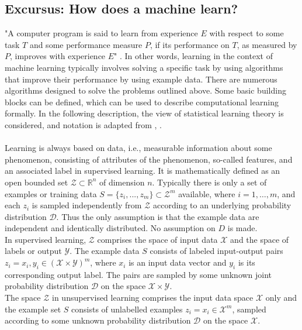 \begin{tcolorbox}
    \subsection*{Excursus: How does a machine learn?}
    "A computer program is said to learn from experience $E$ with respect to some task $T$ and some performance measure $P$, if its performance on $T$, as measured by $P$, improves with experience $E$" \cite{Mitchell1997}. In other words, learning in the context of machine learning typically involves solving a specific task by using algorithms that improve their performance by using example data. There are numerous algorithms designed to solve the problems outlined above. Some basic building blocks can be defined, which can be used to describe computational learning formally. In the following description, the view of statistical learning theory is considered, and notation is adapted from \citeauthor{Shalev2014} \cite{Shalev2014}, \citeauthor{Von_luxburg2011} \cite{Von_luxburg2011}.\\
    \\
    Learning is always based on data, i.e., measurable information about some phenomenon, consisting of attributes of the phenomenon, so-called features, and an associated label in supervised learning. It is mathematically defined as an open bounded set $\mathcal{Z}\subset\mathbb{R}^n$ of dimension $n$. Typically there is only a set of examples or training data $S=\{z_i,...,z_m\}\subset{\mathcal{Z}}^m$ available, where $i = 1,\dots,m$, and each $z_i$ is sampled independently from $\mathcal{Z}$ according to an underlying probability distribution $\mathcal{D}$. Thus the only assumption is that the example data are independent and identically distributed. No assumption on $D$ is made.\\
    In supervised learning, $\mathcal{Z}$ comprises the space of input data $\mathcal{X}$ and the space of labels or output $\mathcal{Y}$. The example data $S$ consists of labeled input-output pairs $z_i=x_i,y_i\in(\mathcal{X}\times\mathcal{Y})^m$, where $x_i$ is an input data vector and $y_i$ is its corresponding output label. The pairs are sampled by some unknown joint probability distribution $\mathcal{D}$ on the space $\mathcal{X}\times\mathcal{Y}$.\\
    The space $\mathcal{Z}$ in unsupervised learning comprises the input data space $\mathcal{X}$ only and the example set $S$ consists of unlabelled examples $z_i=x_i\in\mathcal{X}^m$, sampled according to some unknown probability distribution $\mathcal{D}$ on the space $\mathcal{X}$.\\

\end{tcolorbox}
